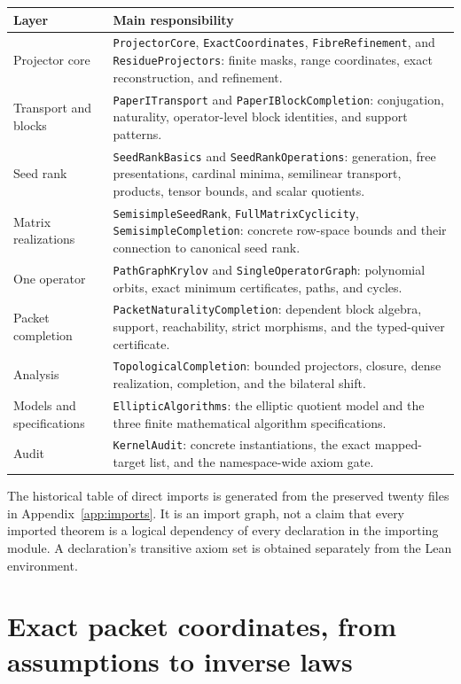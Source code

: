 \documentclass[11pt,a4paper]{article}
\newcommand{\code}[1]{\nolinkurl{#1}}
\begin{document}
\begin{longtable}{p{}p{}}
\toprule Layer & Main responsibility \\\midrule\endhead
Projector core & \code{ProjectorCore}, \code{ExactCoordinates}, \code{FibreRefinement}, and \code{ResidueProjectors}: finite masks, range coordinates, exact reconstruction, and refinement. \\
Transport and blocks & \code{PaperITransport} and \code{PaperIBlockCompletion}: conjugation, naturality, operator-level block identities, and support patterns. \\
Seed rank & \code{SeedRankBasics} and \code{SeedRankOperations}: generation, free presentations, cardinal minima, semilinear transport, products, tensor bounds, and scalar quotients. \\
Matrix realizations & \code{SemisimpleSeedRank}, \code{FullMatrixCyclicity}, \code{SemisimpleCompletion}: concrete row-space bounds and their connection to canonical seed rank. \\
One operator & \code{PathGraphKrylov} and \code{SingleOperatorGraph}: polynomial orbits, exact minimum certificates, paths, and cycles. \\
Packet completion & \code{PacketNaturalityCompletion}: dependent block algebra, support, reachability, strict morphisms, and the typed-quiver certificate. \\
Analysis & \code{TopologicalCompletion}: bounded projectors, closure, dense realization, completion, and the bilateral shift. \\
Models and specifications & \code{EllipticAlgorithms}: the elliptic quotient model and the three finite mathematical algorithm specifications. \\
Audit & \code{KernelAudit}: concrete instantiations, the exact mapped-target list, and the namespace-wide axiom gate. \\
\bottomrule
\end{longtable}

The historical table of direct imports is generated from the preserved twenty files in Appendix~\ref{app:imports}. It is an import graph, not a claim that every imported theorem is a logical dependency of every declaration in the importing module. A declaration's transitive axiom set is obtained separately from the Lean environment.

\section{Exact packet coordinates, from assumptions to inverse laws}\label{sec:packets}
\end{document}
